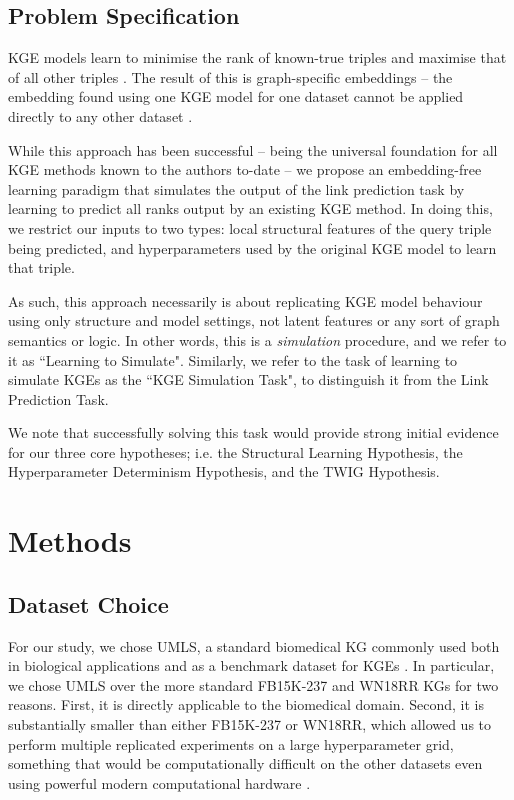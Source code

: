 \subsection{Problem Specification}
KGE models learn to minimise the rank of known-true triples and maximise that of all other triples \cite{kge-survey,rml-review,kge-completion-rev,neg-samp-analysis}. The result of this is graph-specific embeddings -- the embedding found using one KGE model for one dataset cannot be applied directly to any other dataset \cite{kge-survey,rml-review,kge-completion-rev,kg-ovewview}.

While this approach has been successful -- being the universal foundation for all KGE methods known to the authors to-date \cite{kge-survey,rml-review,kge-completion-rev,kg-ovewview,light-into-the-dark,old-dog-new-tricks} -- we propose an embedding-free learning paradigm that simulates the output of the link prediction task by learning to predict all ranks output by an existing KGE method. In doing this, we restrict our inputs to two types: local structural features of the query triple being predicted, and hyperparameters used by the original KGE model to learn that triple.

As such, this approach necessarily is about replicating KGE model behaviour using only structure and model settings, not latent features or any sort of graph semantics or logic. In other words, this is a \textit{simulation} procedure, and we refer to it as ``Learning to Simulate". Similarly, we refer to the task of learning to simulate KGEs as the ``KGE Simulation Task", to distinguish it from the Link Prediction Task.

We note that successfully solving this task would provide strong initial evidence for our three core hypotheses; i.e. the Structural Learning Hypothesis, the Hyperparameter Determinism Hypothesis, and the TWIG Hypothesis.

\section{Methods}
\subsection{Dataset Choice}
For our study, we chose UMLS, a standard biomedical KG commonly used both in biological applications and as a benchmark dataset for KGEs \cite{umls,light-into-the-dark}. In particular, we chose UMLS over the more standard FB15K-237 and WN18RR KGs for two reasons. First, it is directly applicable to the biomedical domain. Second, it is substantially smaller than either FB15K-237 or WN18RR, which allowed us to perform multiple replicated experiments on a large hyperparameter grid, something that would be computationally difficult on the other datasets even using powerful modern computational hardware \cite{umls,light-into-the-dark}. 

